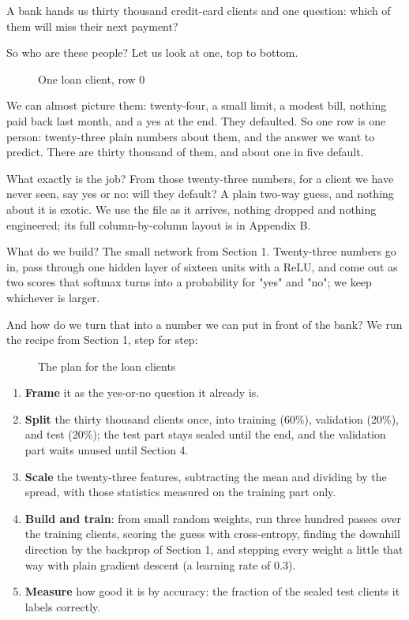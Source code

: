 \documentclass[11pt]{article} %
\begin{document}
A bank hands us thirty thousand credit-card clients and one question: which of them will miss their next payment?

So who are these people? Let us look at one, top to bottom.

\begin{figure}[htbp]
\centering

\caption{One loan client, row 0}
\end{figure}


We can almost picture them: twenty-four, a small limit, a modest bill, nothing paid back last month, and a yes at the end. They defaulted. So one row is one person: twenty-three plain numbers about them, and the answer we want to predict. There are thirty thousand of them, and about one in five default.

What exactly is the job? From those twenty-three numbers, for a client we have never seen, say yes or no: will they default? A plain two-way guess, and nothing about it is exotic. We use the file as it arrives, nothing dropped and nothing engineered; its full column-by-column layout is in Appendix B.

What do we build? The small network from Section 1. Twenty-three numbers go in, pass through one hidden layer of sixteen units with a ReLU, and come out as two scores that softmax turns into a probability for "yes" and "no"; we keep whichever is larger.

And how do we turn that into a number we can put in front of the bank? We run the recipe from Section 1, step for step:

\begin{figure}[htbp]
\centering

\caption{The plan for the loan clients}
\end{figure}


\begin{enumerate}
\item \textbf{Frame} it as the yes-or-no question it already is.
\item \textbf{Split} the thirty thousand clients once, into training (60\%), validation (20\%), and test (20\%); the test part stays sealed until the end, and the validation part waits unused until Section 4.
\item \textbf{Scale} the twenty-three features, subtracting the mean and dividing by the spread, with those statistics measured on the training part only.
\item \textbf{Build and train}: from small random weights, run three hundred passes over the training clients, scoring the guess with cross-entropy, finding the downhill direction by the backprop of Section 1, and stepping every weight a little that way with plain gradient descent (a learning rate of 0.3).
\item \textbf{Measure} how good it is by accuracy: the fraction of the sealed test clients it labels correctly.
\end{enumerate}
\end{document}

